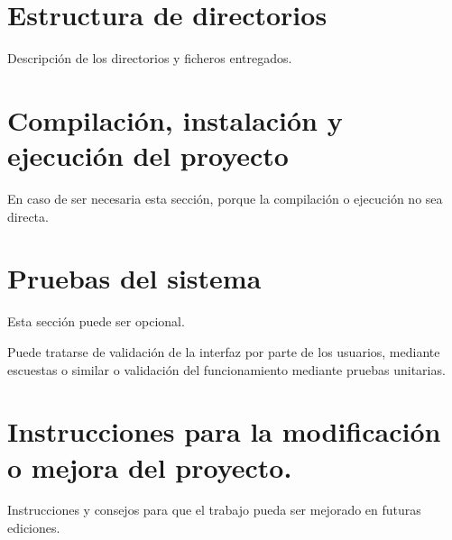 
\section{Estructura de directorios}

Descripción de los directorios y ficheros entregados.

\section{Compilación, instalación y ejecución del proyecto}

En caso de ser necesaria esta sección, porque la compilación o ejecución no sea directa.


\section{Pruebas del sistema}
Esta sección puede ser opcional.

Puede tratarse de validación de la interfaz por parte de los usuarios, mediante escuestas o similar o validación del funcionamiento mediante pruebas unitarias.



\section{Instrucciones para la modificación o mejora del proyecto.}

Instrucciones y consejos para que el trabajo pueda ser mejorado en futuras ediciones.
